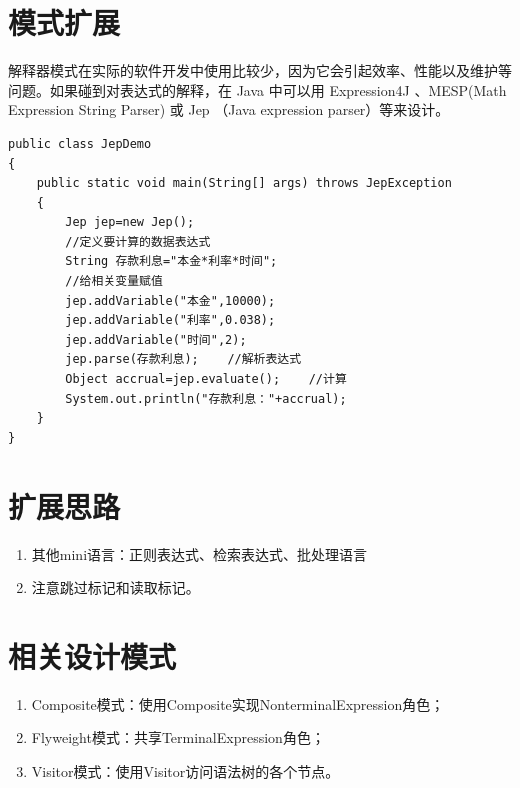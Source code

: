 \section{模式扩展}
解释器模式在实际的软件开发中使用比较少，因为它会引起效率、性能以及维护等问题。如果碰到对表达式的解释，在 Java 中可以用 Expression4J 、MESP(Math Expression String Parser) 或 Jep （Java expression parser）等来设计。
\begin{lstlisting}
public class JepDemo
{
	public static void main(String[] args) throws JepException
	{
		Jep jep=new Jep();
		//定义要计算的数据表达式
		String 存款利息="本金*利率*时间";
		//给相关变量赋值
		jep.addVariable("本金",10000);
		jep.addVariable("利率",0.038);
		jep.addVariable("时间",2);
		jep.parse(存款利息);    //解析表达式
		Object accrual=jep.evaluate();    //计算
		System.out.println("存款利息："+accrual);
	}
}
\end{lstlisting}
\section{扩展思路}
\begin{enumerate}
	\item 其他mini语言：正则表达式、检索表达式、批处理语言
	\item 注意跳过标记和读取标记。
\end{enumerate}
\section{相关设计模式}
\begin{enumerate}
	\item Composite模式：使用Composite实现NonterminalExpression角色；
	\item Flyweight模式：共享TerminalExpression角色；
	\item Visitor模式：使用Visitor访问语法树的各个节点。
\end{enumerate}